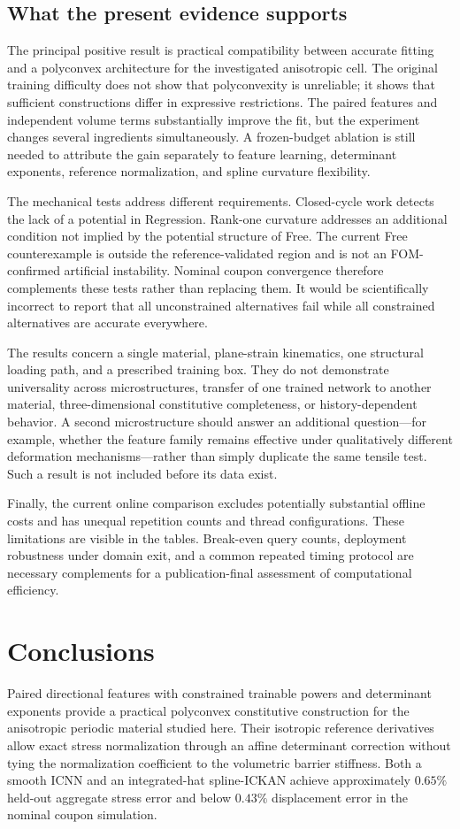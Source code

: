 \documentclass[10pt,a4paper]{article}
\begin{document}
\subsection{What the present evidence supports}
The principal positive result is practical compatibility between accurate fitting and a polyconvex architecture for the investigated anisotropic cell. The original training difficulty does not show that polyconvexity is unreliable; it shows that sufficient constructions differ in expressive restrictions. The paired features and independent volume terms substantially improve the fit, but the experiment changes several ingredients simultaneously. A frozen-budget ablation is still needed to attribute the gain separately to feature learning, determinant exponents, reference normalization, and spline curvature flexibility.

The mechanical tests address different requirements. Closed-cycle work detects the lack of a potential in Regression. Rank-one curvature addresses an additional condition not implied by the potential structure of Free. The current Free counterexample is outside the reference-validated region and is not an FOM-confirmed artificial instability. Nominal coupon convergence therefore complements these tests rather than replacing them. It would be scientifically incorrect to report that all unconstrained alternatives fail while all constrained alternatives are accurate everywhere.

The results concern a single material, plane-strain kinematics, one structural loading path, and a prescribed training box. They do not demonstrate universality across microstructures, transfer of one trained network to another material, three-dimensional constitutive completeness, or history-dependent behavior. A second microstructure should answer an additional question---for example, whether the feature family remains effective under qualitatively different deformation mechanisms---rather than simply duplicate the same tensile test. Such a result is not included before its data exist.

Finally, the current online comparison excludes potentially substantial offline costs and has unequal repetition counts and thread configurations. These limitations are visible in the tables. Break-even query counts, deployment robustness under domain exit, and a common repeated timing protocol are necessary complements for a publication-final assessment of computational efficiency.

\section{Conclusions}
Paired directional features with constrained trainable powers and determinant exponents provide a practical polyconvex constitutive construction for the anisotropic periodic material studied here. Their isotropic reference derivatives allow exact stress normalization through an affine determinant correction without tying the normalization coefficient to the volumetric barrier stiffness. Both a smooth ICNN and an integrated-hat spline-ICKAN achieve approximately $0.65\%$ held-out aggregate stress error and below $0.43\%$ displacement error in the nominal coupon simulation.
\end{document}
